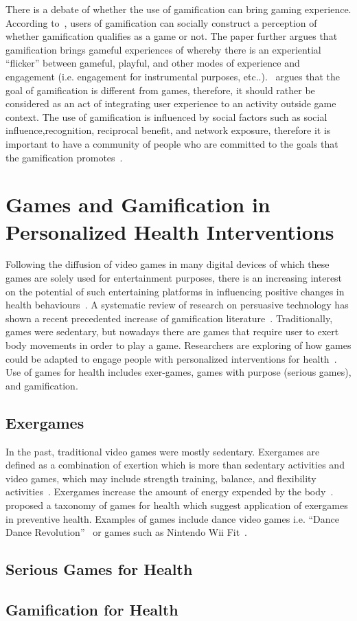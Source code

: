 There is a debate of whether the use of gamification can bring gaming experience. According to~\cite{deterding2011game}, users of gamification can socially construct a perception of whether gamification qualifies as a game or not. The paper further argues that gamification brings gameful experiences of whereby there is an experiential ``flicker'' between gameful, playful, and other modes of experience and engagement (i.e. engagement for instrumental purposes, etc..).~\cite{seaborn2015:gamification} argues that the goal of gamification is different from games, therefore, it should rather be considered as an act of integrating user experience to an activity outside game context. The use of gamification is influenced by social factors such as social influence,recognition, reciprocal benefit, and network exposure, therefore it is important to have a community of people who are committed to the goals that the gamification promotes~\citep{hamari2013social}.

\section{Games and Gamification in Personalized Health Interventions}
Following the diffusion of video games in many digital devices of which these games are solely used for entertainment purposes, there is an increasing interest on the potential of such entertaining platforms in influencing positive changes in health behaviours~\citep{king2013gamification}. A systematic review of research on persuasive technology has shown a recent precedented increase of gamification literature~\citep{hamari2014persuasive}. Traditionally, games were sedentary, but nowadays there are games that require user to exert body movements in order to play a game. Researchers are exploring of how games could be adapted to engage people with personalized interventions for health~\citep{mccallum2012gamification}. Use of games for health includes exer-games, games with purpose (serious games), and gamification.
\subsection{Exergames}
In the past, traditional video games were mostly sedentary. Exergames are defined as a combination of exertion which is more than sedentary activities and video games, which may include strength training, balance, and flexibility activities~\citep{oh2010defining}. Exergames increase the amount of energy expended by the body~\citep{graves2010physiological}. ~\cite{mccallum2012gamification} proposed a taxonomy of games for health which suggest application of exergames in preventive health. Examples of games include  dance video games i.e. ``Dance Dance Revolution''~\citep{lieberman2006dance} or games such as Nintendo Wii Fit~\citep{gobel2010serious}. 

\subsection{Serious Games for Health}
\subsection{Gamification for Health}

\begin{flushright}
\end{flushright}
